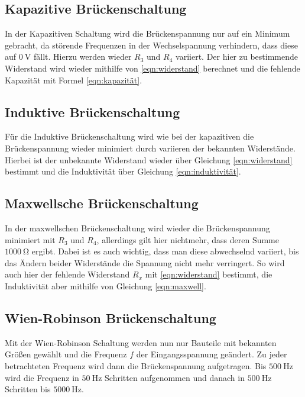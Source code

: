 \subsection{Kapazitive Brückenschaltung}
In der Kapazitiven Schaltung wird die Brückenspannung nur auf ein Minimum gebracht, da störende Frequenzen in der 
Wechselspannung verhindern, dass diese auf $\qty{0}{\volt}$ fällt. Hierzu werden wieder $R_3$ und $R_4$ variiert.
Der hier zu bestimmende Widerstand wird wieder mithilfe von \ref{eqn:widerstand} berechnet und die fehlende Kapazität
mit Formel \ref{eqn:kapazität}.

\subsection{Induktive Brückenschaltung}
Für die Induktive Brückenschaltung wird wie bei der kapazitiven die Brückenspannung wieder minimiert durch variieren
der bekannten Widerstände. Hierbei ist der unbekannte Widerstand wieder über Gleichung \ref{eqn:widerstand} bestimmt
und die Induktivität über Gleichung \ref{eqn:induktivität}.

\subsection{Maxwellsche Brückenschaltung}
In der maxwellschen Brückenschaltung wird wieder die Brückenspannung minimiert mit $R_3$ und $R_4$, allerdings gilt hier
nichtmehr, dass deren Summe $\qty{1000}{\ohm}$ ergibt. Dabei ist es auch wichtig, dass man diese abwechselnd variiert, bis
das Ändern beider Widerstände die Spannung nicht mehr verringert. So wird auch hier der fehlende Widerstand $R_x$ mit \ref{eqn:widerstand}
bestimmt, die Induktivität aber mithilfe von Gleichung \ref{eqn:maxwell}.

\subsection{Wien-Robinson Brückenschaltung}
Mit der Wien-Robinson Schaltung werden nun nur Bauteile mit bekannten Größen gewählt und die Frequenz $f$ 
der Eingangsspannung geändert. Zu jeder betrachteten Frequenz wird dann die Brückenspannung aufgetragen. Bis 
$\qty{500}{\hertz}$ wird die Frequenz in $\qty{50}{\hertz}$ Schritten aufgenommen und danach in $\qty{500}{\hertz}$
Schritten bis $\qty{5000}{\hertz}$.



\label{sec:Durchführung}
